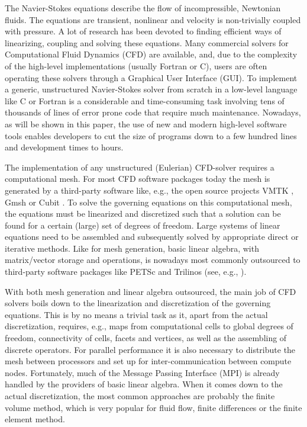 \documentclass[final,3p,times,twocolumn]{elsarticle}
\begin{document}
The Navier-Stokes equations describe the flow of incompressible, Newtonian fluids. The equations are transient, nonlinear and velocity is non-trivially coupled with pressure. A lot of research has been devoted to finding efficient ways of linearizing, coupling and solving these equations. Many commercial solvers for Computational Fluid Dynamics (CFD) are available, and, due to the complexity of the high-level implementations (usually Fortran or C), users are often operating these solvers through a Graphical User Interface (GUI). To implement a generic, unstructured Navier-Stokes solver from scratch in a low-level language like C or Fortran is a considerable and time-consuming task involving tens of thousands of lines of error prone code that require much maintenance. Nowadays, as will be shown in this paper, the use of new and modern high-level software tools enables developers to cut the size of programs down to a few hundred lines and development times to hours.

The implementation of any unstructured (Eulerian) CFD-solver requires a computational mesh. For most CFD software packages today the mesh is generated by a third-party software like, e.g., the open source projects VMTK \cite{vmtk}, Gmsh \cite{gmsh} or Cubit \cite{cubit}. To solve the governing equations on this computational mesh, the equations must be linearized and discretized such that a solution can be found for a certain (large) set of degrees of freedom. Large systems of linear equations need to be assembled and subsequently solved by appropriate direct or iterative methods. Like for mesh generation, basic linear algebra, with matrix/vector storage and operations, is nowadays most commonly outsourced to third-party software packages like PETSc \cite{petsc-web-page} and Trilinos \cite{trilinos} (see, e.g., \cite{openfvm, fluidity, oofem}).

With both mesh generation and linear algebra outsourced, the main job of CFD solvers boils down to the linearization and discretization of the governing equations. This is by no means a trivial task as it, apart from the actual discretization, requires, e.g., maps from computational cells to global degrees of freedom, connectivity of cells, facets and vertices, as well as the assembling of discrete operators. For parallel performance it is also necessary to distribute the mesh between processors and set up for inter-communication between compute nodes. Fortunately, much of the Message Passing Interface (MPI) is already handled by the providers of basic linear algebra. When it comes down to the actual discretization, the most common approaches are probably the finite volume method, which is very popular for fluid flow, finite differences or the finite element method.
\end{document}
